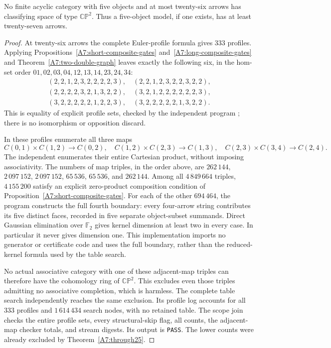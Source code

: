 \begin{theorem}
\label{A7:through26}
No finite acyclic category with five objects and at most twenty-six
arrows has classifying space of type $\mathbb{CP}^2$. Thus a
five-object model, if one exists, has at least twenty-seven arrows.
\end{theorem}
\begin{proof}
At twenty-six arrows the complete Euler-profile formula gives
$333$ profiles. Applying Propositions~\ref{A7:short-composite-gates}
and~\ref{A7:long-composite-gates} and
Theorem~\ref{A7:two-double-graph} leaves exactly the following six,
in the hom-set order $01,02,03,04,12,13,14,23,24,34$:
\[
\begin{gathered}
(2,2,1,2,3,2,2,2,2,3),\quad(2,2,1,2,3,2,2,3,2,2),\\
(2,2,2,2,3,2,1,3,2,2),\quad(3,2,1,2,2,2,2,2,2,3),\\
(3,2,2,2,2,2,1,2,2,3),\quad(3,2,2,2,2,2,1,3,2,2).
\end{gathered}
\]
This is equality of explicit profile sets, checked by the
independent program ; there
is no isomorphism or opposition discard.

In these profiles enumerate all three maps
\[
 C(0,1)\times C(1,2)\to C(0,2),\quad
 C(1,2)\times C(2,3)\to C(1,3),\quad
 C(2,3)\times C(3,4)\to C(2,4).
\]
The independent 
enumerates their entire Cartesian product, without imposing
associativity. The numbers of map triples, in the order above,
are $262\,144$, $2\,097\,152$, $2\,097\,152$, $65\,536$,
$65\,536$, and $262\,144$. Among all $4\,849\,664$ triples,
$4\,155\,200$ satisfy an explicit zero-product composition
condition of Proposition~\ref{A7:short-composite-gates}.
For each of the other $694\,464$, the program constructs the
full fourth boundary: every four-arrow string contributes its
five distinct faces, recorded in five separate object-subset
summands. Direct Gaussian elimination over $\mathbb F_2$ gives
kernel dimension at least two in every case. In particular it
never gives dimension one. This implementation imports no
generator or certificate code and uses the full boundary, rather
than the reduced-kernel formula used by the table search.

No actual associative category with one of these adjacent-map
triples can therefore have the cohomology ring of
$\mathbb{CP}^2$. This excludes even those triples admitting no
associative completion, which is harmless. The complete table
search  independently reaches
the same exclusion. Its profile log accounts for all $333$
profiles and $1\,614\,434$ search nodes, with no retained table.
The scope join  checks the
entire profile sets, every structural-skip flag, all counts, the
adjacent-map checker totals, and stream digests. Its output
 is \texttt{PASS}.
The lower counts were already excluded by
Theorem~\ref{A7:through25}.
\end{proof}

